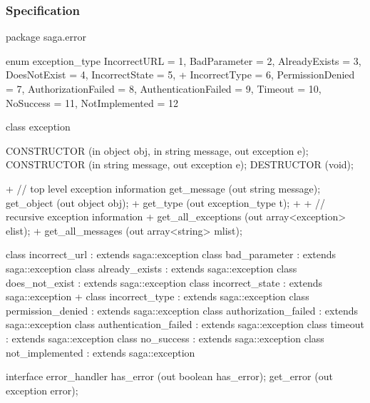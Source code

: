  
 \newpage
 
 \subsubsection{Specification}
 
 \begin{myspec}
  package saga.error
  {
    enum exception_type
    {
      IncorrectURL         =  1,
      BadParameter         =  2,
      AlreadyExists        =  3,
      DoesNotExist         =  4,
      IncorrectState       =  5,
+     IncorrectType        =  6,
      PermissionDenied     =  7,
      AuthorizationFailed  =  8,
      AuthenticationFailed =  9,
      Timeout              = 10,
      NoSuccess            = 11,
      NotImplemented       = 12
    }

    class exception
    {
      CONSTRUCTOR          (in  object           obj,
                            in  string           message,
                            out exception        e);
      CONSTRUCTOR          (in  string           message,
                            out exception        e);
      DESTRUCTOR           (void);
 
+     // top level exception information
      get_message          (out string           message);
      get_object           (out object           obj);
+     get_type             (out exception_type   t);
+
+     // recursive exception information
+     get_all_exceptions   (out array<exception> elist);
+     get_all_messages     (out array<string>    mlist);
    }
 
 
    class incorrect_url         : extends saga::exception { }
    class bad_parameter         : extends saga::exception { }
    class already_exists        : extends saga::exception { }
    class does_not_exist        : extends saga::exception { }
    class incorrect_state       : extends saga::exception { }
+   class incorrect_type        : extends saga::exception { }
    class permission_denied     : extends saga::exception { }
    class authorization_failed  : extends saga::exception { }
    class authentication_failed : extends saga::exception { }
    class timeout               : extends saga::exception { }
    class no_success            : extends saga::exception { }
    class not_implemented       : extends saga::exception { }
 
 
    interface error_handler
    {
      has_error            (out boolean        has_error);
      get_error            (out exception      error);
    }
  }
 \end{myspec}
 

